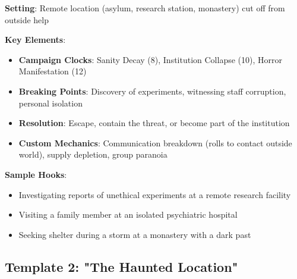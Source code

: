 \documentclass[11pt]{article}
\begin{document}
\begin{mdframed}[backgroundcolor=horrorbg]
\textbf{Setting}: Remote location (asylum, research station, monastery) cut off from outside help

\textbf{Key Elements}:
\begin{itemize}[leftmargin=*]
\item \textbf{Campaign Clocks}: Sanity Decay (8), Institution Collapse (10), Horror Manifestation (12)
\item \textbf{Breaking Points}: Discovery of experiments, witnessing staff corruption, personal isolation
\item \textbf{Resolution}: Escape, contain the threat, or become part of the institution
\item \textbf{Custom Mechanics}: Communication breakdown (rolls to contact outside world), supply depletion, group paranoia
\end{itemize}

\textbf{Sample Hooks}:
\begin{itemize}[leftmargin=*]
\item Investigating reports of unethical experiments at a remote research facility
\item Visiting a family member at an isolated psychiatric hospital
\item Seeking shelter during a storm at a monastery with a dark past
\end{itemize}
\end{mdframed}

\subsection*{Template 2: "The Haunted Location"}
\end{document}
